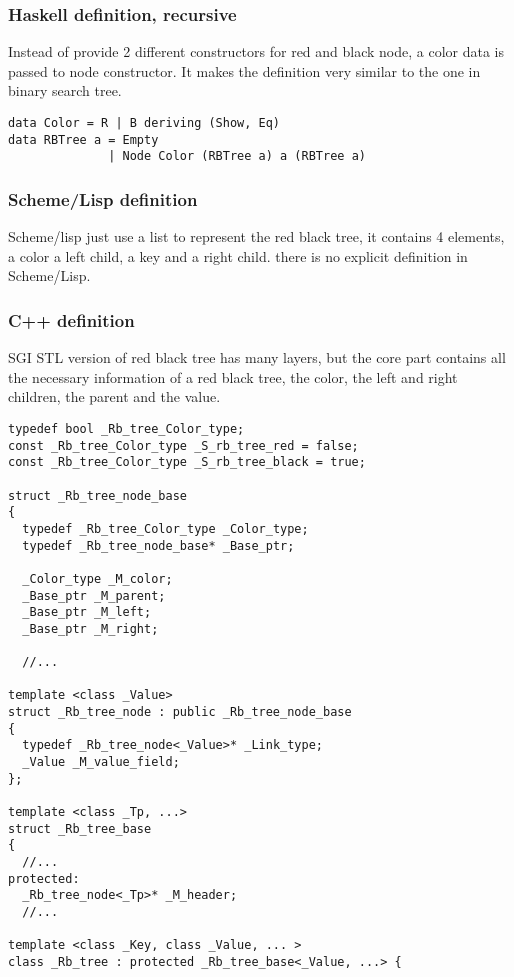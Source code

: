 \documentclass{article}
\begin{document}
\subsubsection*{Haskell definition, recursive}
Instead of provide 2 different constructors for red and black node, a color
data is passed to node constructor. It makes the definition very similar to the 
one in binary search tree.

\lstset{language=Haskell}
\begin{lstlisting}
data Color = R | B deriving (Show, Eq) 
data RBTree a = Empty
              | Node Color (RBTree a) a (RBTree a)
\end{lstlisting}

\subsubsection*{Scheme/Lisp definition}
Scheme/lisp just use a list to represent the red black tree, it
contains 4 elements, a color a left child, a key and a right
child. there is no explicit definition in Scheme/Lisp. 

\subsubsection*{C++ definition}
SGI STL version of red black tree has many layers, but the core part
contains all the necessary information of a red black tree, the
color, the left and right children, the parent and the value.

\lstset{language=c++}
\begin{lstlisting}
typedef bool _Rb_tree_Color_type;
const _Rb_tree_Color_type _S_rb_tree_red = false;
const _Rb_tree_Color_type _S_rb_tree_black = true;

struct _Rb_tree_node_base
{
  typedef _Rb_tree_Color_type _Color_type;
  typedef _Rb_tree_node_base* _Base_ptr;

  _Color_type _M_color; 
  _Base_ptr _M_parent;
  _Base_ptr _M_left;
  _Base_ptr _M_right;

  //...

template <class _Value>
struct _Rb_tree_node : public _Rb_tree_node_base
{
  typedef _Rb_tree_node<_Value>* _Link_type;
  _Value _M_value_field;
};

template <class _Tp, ...>
struct _Rb_tree_base
{
  //...
protected:
  _Rb_tree_node<_Tp>* _M_header;
  //...

template <class _Key, class _Value, ... >
class _Rb_tree : protected _Rb_tree_base<_Value, ...> {
\end{lstlisting}
\end{document}
